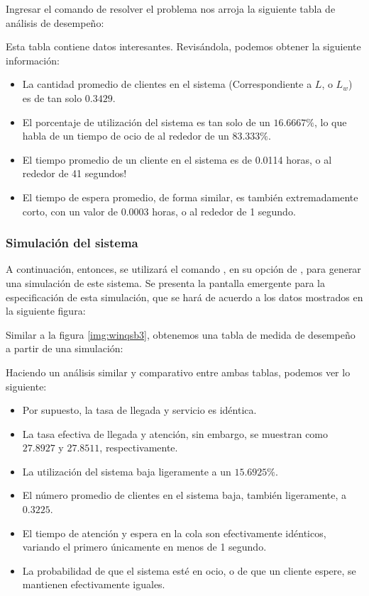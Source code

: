 Ingresar el comando de resolver el problema nos arroja la siguiente tabla de análisis de desempeño:

Esta tabla contiene datos interesantes. Revisándola, podemos obtener la siguiente información:
\begin{itemize}
    \item La cantidad promedio de clientes en el sistema (Correspondiente a $L$, o $L_w$) es de tan solo $0.3429$.
    \item El porcentaje de utilización del sistema es tan solo de un $16.6667\%$, lo que habla de un tiempo de ocio de al rededor de un $83.333\%$.
    \item El tiempo promedio de un cliente en el sistema es de 0.0114 horas, o al rededor de 41 segundos!
    \item El tiempo de espera promedio, de forma similar, es también extremadamente corto, con un valor de $0.0003$ horas, o al rededor de 1 segundo.
\end{itemize}

\subsubsection{Simulación del sistema}
A continuación, entonces, se utilizará el comando  , en su opción de , para generar una simulación de este sistema. Se presenta la pantalla emergente para la especificación de esta simulación, que se hará de acuerdo a los datos mostrados en la siguiente figura:

Similar a la figura \ref{img:winqsb3}, obtenemos una tabla de medida de desempeño a partir de una simulación:

Haciendo un análisis similar y comparativo entre ambas tablas, podemos ver lo siguiente:

\begin{itemize}
    \item Por supuesto, la tasa de llegada y servicio es idéntica.
    \item La tasa efectiva de llegada y atención, sin embargo, se muestran como $27.8927$ y $27.8511$, respectivamente.
    \item La utilización del sistema baja ligeramente a un $15.6925\%$.
    \item El número promedio de clientes en el sistema baja, también ligeramente, a $0.3225$.
    \item El tiempo de atención y espera en la cola son efectivamente idénticos, variando el primero únicamente en menos de 1 segundo.
    \item La probabilidad de que el sistema esté en ocio, o de que un cliente espere, se mantienen efectivamente iguales.
\end{itemize}

